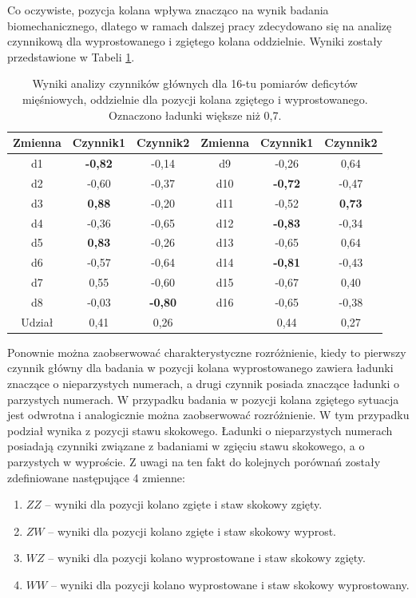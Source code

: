 Co oczywiste, pozycja kolana wpływa znacząco na wynik badania biomechanicznego, dlatego w ramach dalszej pracy zdecydowano się na  analizę czynnikową dla wyprostowanego i zgiętego kolana oddzielnie. Wyniki zostały przedstawione w Tabeli \ref{tab:pca-muscles-knee-strait-bended}. 

\begin{table}[h]
	\centering
	\setlength{\tabcolsep}{3pt}
	\setlength\extrarowheight{2pt}
	\caption{Wyniki analizy czynników głównych dla 16-tu pomiarów deficytów mięśniowych, oddzielnie dla pozycji kolana zgiętego i wyprostowanego. Oznaczono ładunki większe niż 0,7.}
	\label{tab:pca-muscles-knee-strait-bended}
	\begin{tabular}{c|c|c||c|c|c}
		
		Zmienna&Czynnik1&Czynnik2&Zmienna&Czynnik1&Czynnik2 \\
		\hline \hline
		d1&\textbf{-0,82}&-0,14&d9&-0,26&0,64 \\
		\hline
		d2&-0,60&-0,37&d10&\textbf{-0,72}&-0,47 \\
		\hline
		d3&\textbf{0,88}&-0,20&d11&-0,52&\textbf{0,73} \\
		\hline
		d4&-0,36&-0,65&d12&\textbf{-0,83}&-0,34 \\
		\hline
		d5&\textbf{0,83}&-0,26&d13&-0,65&0,64 \\
		\hline
		d6&-0,57&-0,64&d14&\textbf{-0,81}&-0,43 \\
		\hline
		d7&0,55&-0,60&d15&-0,67&0,40 \\
		\hline
		d8&-0,03&\textbf{-0,80}&d16&-0,65&-0,38 \\
		\hline\hline
		Udział&0,41&0,26&&0,44&0,27 \\
		
	\end{tabular}
\end{table}

Ponownie można zaobserwować charakterystyczne rozróżnienie, kiedy to pierwszy czynnik główny dla badania w pozycji kolana wyprostowanego zawiera ładunki znaczące o nieparzystych numerach, a drugi czynnik posiada znaczące ładunki o parzystych numerach. W przypadku badania w pozycji kolana zgiętego sytuacja jest odwrotna i analogicznie można zaobserwować rozróżnienie. W tym przypadku podział wynika z pozycji stawu skokowego. Ładunki o nieparzystych numerach posiadają czynniki związane z badaniami w zgięciu stawu skokowego, a o parzystych w wyproście. Z uwagi na ten fakt do kolejnych porównań zostały zdefiniowane następujące 4 zmienne:
\begin{enumerate}
	\item $ZZ$ -- wyniki dla pozycji kolano zgięte i staw skokowy zgięty.
	\item $ZW$ -- wyniki dla pozycji kolano zgięte i staw skokowy wyprost.
	\item $WZ$ -- wyniki dla pozycji kolano wyprostowane i staw skokowy zgięty.
	\item $WW$ -- wyniki dla pozycji kolano wyprostowane i staw skokowy wyprostowany.
\end{enumerate} 


